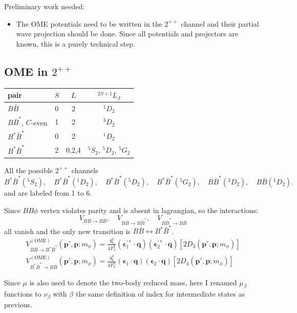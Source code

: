 \documentclass[aps,prl,showpacs,amsmath,onecolumn,superscriptaddress,floatfix,nofootinbib,notitlepage]{revtex4-2}
\newcommand{\vep}{{\bm p}}
\newcommand{\veq}{{\bm q}}
\newcommand{\be}{\begin{equation}}
\newcommand{\ee}{\end{equation}}
\newcommand{\veep}{{\bm \epsilon}}
\newcommand{\veepst}{{\bm \epsilon}^{\prime*}}
\begin{document}
Preliminary work needed:
\begin{itemize}
	\item The OME potentials need to be written in the $2^{++}$ channel and their partial wave projection should be done. Since all potentials and projectors are known, this is a purely technical step.
\end{itemize}

\subsection{OME in $2^{++}$}
\begin{center}

	\begin{tabular*}{0.5\textwidth}{@{\extracolsep{\fill}}lccc@{}}    \toprule
		pair & $S$ & $L$ & $^{2S+1}L_J$\\
		\midrule
		$B\bar{B}$ & 0   &  2 & $^1D_2$\\
		$B\bar{B}^*$, $C$-even & 1 & 2 & $^3D_2$\\
		$B^*\bar{B}^*$ & 0 & 2 & $^1D_2$\\
		$B^* \bar{B}^*$ & 2 & 0,2,4 & $^5S_2$, $^5D_2$, $^5G_2$\\
		\bottomrule
	\end{tabular*}
\end{center}

All the possible $2^{++}$ channels
\be
B^*\bar{B}^*(^5S_2),\quad B^*\bar{B}^*(^1D_2),\quad B^*\bar{B}^*(^5D_2),\quad B^*\bar{B}^*(^5G_2),\quad B\bar{B}^*(^3D_2),\quad B\bar{B}(^1D_2).
\ee
and are labeled from 1 to 6.

Since $BB\phi$ vertex violates parity and is absent in lagrangian, so the interactions:
\be
V_{B\bar{B}\to B\bar{B}}, \quad V_{B\bar{B} \to B\bar{B}^*},\quad V_{B\bar{B}^* \to B\bar{B}}
\ee
all vanish and the only new transition is $B\bar{B} \leftrightarrow B^*\bar{B}^*$.
\be
\begin{split}
	V_{B\bar{B}\rightarrow B^*\bar{B}^*}^{(\text{OME})}(\vep',\vep; m_\phi) = \frac{g_b^2}{4F_\pi^2}(\veepst_1 \cdot \veq)(\veepst_2 \cdot \veq)\left[2D_3(\vep',\vep;m_\phi)\right] \\
	V_{B^*\bar{B}^*\rightarrow B\bar{B}}^{(\text{OME})}(\vep',\vep; m_\phi) = \frac{g_b^2}{4F_\pi^2}(\veep_1 \cdot \veq)(\veep_2 \cdot \veq)\left[2D_4(\vep',\vep;m_\phi)\right]
\end{split}
\ee

Since $\mu$ is also used to denote the two-body reduced mass, here I renamed $\mu_\beta$ functions to $\nu_\beta$ with $\beta$ the same definition of index for intermediate states as previous.
\end{document}
